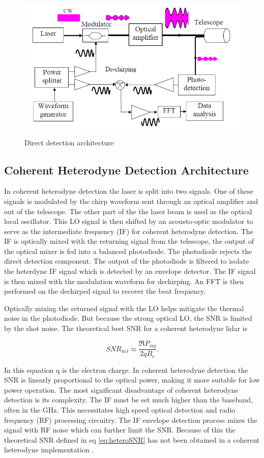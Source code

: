 \begin{figure}[H]
	\centering
	\includegraphics[width=0.8\columnwidth]{figs/direct}
	\vspace{1em}
	\caption{Direct detection architecture}
	\label{fig:directBlock}
\end{figure}

\subsection{Coherent Heterodyne Detection Architecture}
In coherent heterodyne detection the laser is split into two signals. One of these signals is modulated by the 
chirp waveform sent through an optical amplifier and out of the telescope. The other part of the the laser beam 
is used as the optical local oscillator. This LO signal is then shifted by an acousto-optic modulator to serve as
the intermediate frequency (IF) for coherent heterodyne detection. The IF is optically mixed with the returning 
signal from the telescope, the output of the optical mixer is fed into a balanced photodiode. The photodiode 
rejects the direct detection component. The output of the photodiode is filtered to isolate the heterdyne IF 
signal which is detected by an envelope detector. The IF signal is then mixed with the modulation waveform 
for dechirping. An FFT is then performed on the dechirped signal to recover the beat frequency.  

Optically mixing the returned signal with the LO helps mitigate the thermal noise in the photodiode. But because
the strong optical LO, the SNR is limited by the shot noise. The theoretical best SNR for a coherent heterodyne 
lidar is

\begin{equation}
\label{eq:heteroSNR}
SNR_{het}\approx\frac{\Re P_{sig}}{2qB_e}. 
\end{equation}

In this equation q is the electron charge. In coherent heterodyne detection the SNR is linearly proportional to 
the optical power, making it more suitable for low power operation. The most significant disadvantage of coherent
heterodyne detection is its complexity. The IF must be set much higher than the baseband, often in the GHz. This 
necessitates high speed optical detection and radio frequency (RF) processing circuitry. The IF envelope detection
process mixes the signal with RF noise which can further limit the SNR. Because of this the theoretical SNR defined
in eq \ref{eq:heteroSNR} has not been obtained in a coherent heterodyne implementation \cite{1319mmPerf}.  

